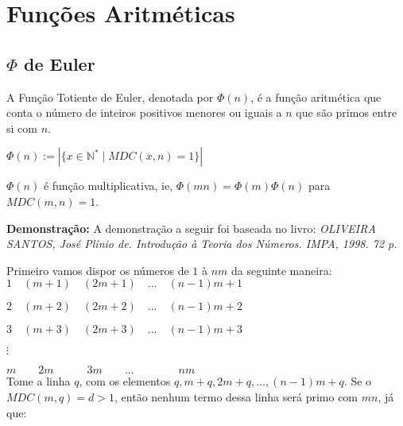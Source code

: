 
\chapter{Funções Aritméticas} %

\label{Chapter3} %


\section{$\Phi$ de Euler}

\begin{definition}
A Função Totiente de Euler, denotada por $\Phi(n)$, é a função aritmética que conta o número 
de inteiros positivos menores ou iguais a $n$ que são primos entre si com $n$.

$\Phi(n) := |\{ x \in \mathbb{N}^{*} \mid MDC(x,n) = 1 \}|$
\end{definition}



\begin{theorem}\label{phi_multiplicativa}
$\Phi(n)$ é função multiplicativa, ie, $\Phi(mn) = \Phi(m)\Phi(n)$ para $MDC(m,n) = 1$.
\end{theorem}
\textbf{Demonstração:}
A demonstração a seguir foi baseada no livro: \textit{OLIVEIRA SANTOS, José Plínio de. Introdução à Teoria dos Números. IMPA, 1998. 72 p.}

Primeiro vamos dispor os números de $1$ à $nm$ da seguinte maneira:\\

$1\quad(m+1)\quad(2m+1)\quad...\quad(n-1)m+1$

$2\quad(m+2)\quad(2m+2)\quad...\quad(n-1)m+2$

$3\quad(m+3)\quad(2m+3)\quad...\quad(n-1)m+3$

$\vdots$

$m\quad\quad2m\quad\quad\quad3m\quad\quad...\quad\quad\quad\quad{nm}$\\

Tome a linha $q$, com os elementos $q,m+q,2m+q,...,(n-1)m+q$. Se o $MDC(m,q) = d > 1$, então nenhum termo dessa linha será primo com
$mn$, já que: 
\\

